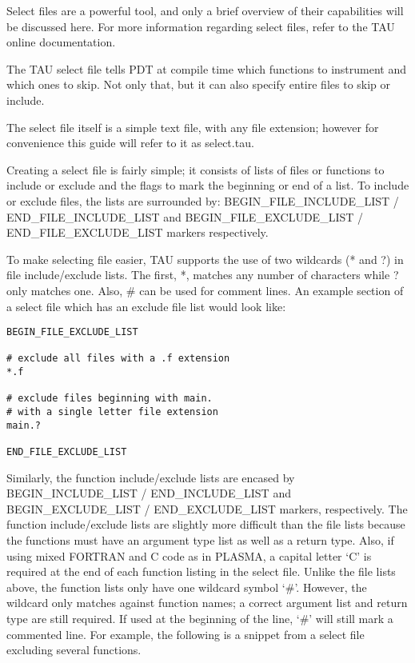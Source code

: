 \documentclass[11pt,letterpaper]{article}
\begin{document}
Select files are a powerful tool, and only a brief overview of their capabilities will be discussed here. For more information regarding select files, refer to the TAU online documentation.

The TAU select file tells PDT at compile time which functions to instrument and which ones to skip. Not only that, but it can also specify entire files to skip or include.

The select file itself is a simple text file, with any file extension; however for convenience this guide will refer to it as select.tau.

Creating a select file is fairly simple; it consists of lists of files or functions to include or exclude and the flags to mark the beginning or end of a list. To include or exclude files, the lists are surrounded by:
BEGIN\_FILE\_INCLUDE\_LIST / END\_FILE\_INCLUDE\_LIST and
BEGIN\_FILE\_EXCLUDE\_LIST / END\_FILE\_EXCLUDE\_LIST markers respectively.

To make selecting file easier, TAU supports the use of two wildcards (* and ?) in file include/exclude lists. The first, *, matches any number of characters while ? only matches one. Also, \# can be used for comment lines. An example section of a select file which has an exclude file list would look like:

\begin{verbatim}
BEGIN_FILE_EXCLUDE_LIST

# exclude all files with a .f extension
*.f

# exclude files beginning with main.
# with a single letter file extension
main.?

END_FILE_EXCLUDE_LIST
\end{verbatim}

Similarly, the function include/exclude lists are encased by
BEGIN\_INCLUDE\_LIST / END\_INCLUDE\_LIST and BEGIN\_EXCLUDE\_LIST / END\_EXCLUDE\_LIST markers, respectively. The function include/exclude lists are slightly more difficult than the file lists because the functions must have an argument type list as well as a return type. Also, if using mixed FORTRAN and C code as in PLASMA, a capital letter `C' is required at the end of each function listing in the select file. Unlike the file lists above, the function lists only have one wildcard symbol `\#'. However, the wildcard only matches against function names; a correct argument list and return type are still required. If used at the beginning of the line, `\#' will still mark a commented line.
For example, the following is a snippet from a select file excluding several functions.
\end{document}
